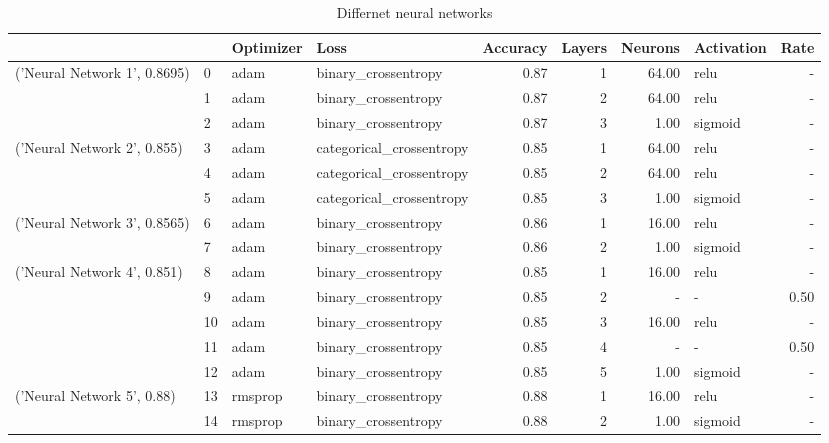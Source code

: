 \begin{table}[h!]
\caption{Differnet neural networks}
\label{tab:RawData}
\begin{tabular}{llllrrrlr}
\toprule
 &  & Optimizer & Loss & Accuracy & Layers & Neurons & Activation & Rate \\
\midrule
\multirow[t]{3}{*}{('Neural Network 1', 0.8695)} & 0 & adam & binary_crossentropy & 0.87 & 1 & 64.00 & relu & - \\
 & 1 & adam & binary_crossentropy & 0.87 & 2 & 64.00 & relu & - \\
 & 2 & adam & binary_crossentropy & 0.87 & 3 & 1.00 & sigmoid & - \\
\cline{1-9}
\multirow[t]{3}{*}{('Neural Network 2', 0.855)} & 3 & adam & categorical_crossentropy & 0.85 & 1 & 64.00 & relu & - \\
 & 4 & adam & categorical_crossentropy & 0.85 & 2 & 64.00 & relu & - \\
 & 5 & adam & categorical_crossentropy & 0.85 & 3 & 1.00 & sigmoid & - \\
\cline{1-9}
\multirow[t]{2}{*}{('Neural Network 3', 0.8565)} & 6 & adam & binary_crossentropy & 0.86 & 1 & 16.00 & relu & - \\
 & 7 & adam & binary_crossentropy & 0.86 & 2 & 1.00 & sigmoid & - \\
\cline{1-9}
\multirow[t]{5}{*}{('Neural Network 4', 0.851)} & 8 & adam & binary_crossentropy & 0.85 & 1 & 16.00 & relu & - \\
 & 9 & adam & binary_crossentropy & 0.85 & 2 & - & - & 0.50 \\
 & 10 & adam & binary_crossentropy & 0.85 & 3 & 16.00 & relu & - \\
 & 11 & adam & binary_crossentropy & 0.85 & 4 & - & - & 0.50 \\
 & 12 & adam & binary_crossentropy & 0.85 & 5 & 1.00 & sigmoid & - \\
\cline{1-9}
\multirow[t]{2}{*}{('Neural Network 5', 0.88)} & 13 & rmsprop & binary_crossentropy & 0.88 & 1 & 16.00 & relu & - \\
 & 14 & rmsprop & binary_crossentropy & 0.88 & 2 & 1.00 & sigmoid & - \\
\cline{1-9}
\bottomrule
\end{tabular}
\end{table}
